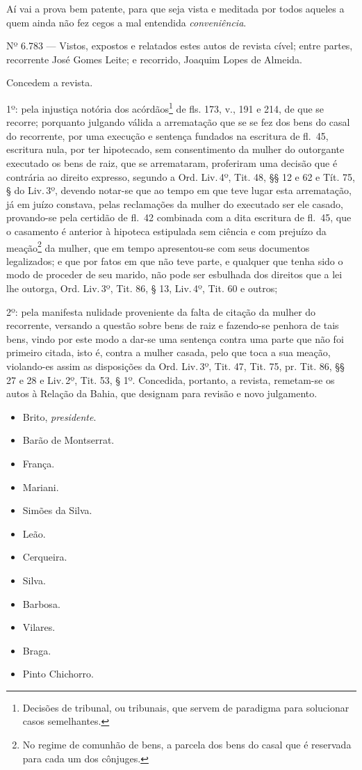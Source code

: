 Aí vai a prova bem patente, para que seja vista e meditada por todos
aqueles a quem ainda não fez cegos a mal entendida \emph{conveniência}.

Nº 6.783 --- Vistos, expostos e relatados estes autos de revista cível;
entre partes, recorrente José Gomes Leite; e recorrido, Joaquim Lopes de
Almeida.

Concedem a revista.

1º: pela injustiça notória dos acórdãos\footnote{Decisões de tribunal,
  ou tribunais, que servem de paradigma para solucionar casos
  semelhantes.} de fls. 173, v., 191 e 214, de que se recorre;
porquanto julgando válida a arrematação que se se fez dos bens do casal
do recorrente, por uma execução e sentença fundados na escritura
de fl.~45, escritura nula, por ter hipotecado, sem consentimento
da mulher do outorgante executado os bens de raiz, que se arremataram,
proferiram uma decisão que é contrária ao direito expresso, segundo a
Ord. Liv.\,4º, Tit. 48, §§ 12 e 62 e Tít. 75, § do Liv.\,3º, devendo
notar-se que ao tempo em que teve lugar esta arrematação, já em juízo
constava, pelas reclamações da mulher do executado ser ele casado,
provando-se pela certidão de fl.~42 combinada com a dita escritura
de fl.~45, que o casamento é anterior à hipoteca estipulada sem
ciência e com prejuízo da meação\footnote{No regime de comunhão de
  bens, a parcela dos bens do casal que é reservada para cada um dos
  cônjuges.} da mulher, que em tempo apresentou-se com seus documentos
legalizados; e que por fatos em que não teve parte, e qualquer que tenha
sido o modo de proceder de seu marido, não pode ser esbulhada dos
direitos que a lei lhe outorga, Ord. Liv.\,3º, Tit. 86, § 13, Liv.\,4º,
Tit. 60 e outros;

2º: pela manifesta nulidade proveniente da falta de citação da mulher do
recorrente, versando a questão sobre bens de raiz e fazendo-se penhora
de tais bens, vindo por este modo a dar-se uma sentença contra uma parte
que não foi primeiro citada, isto é, contra a mulher casada, pelo que
toca a sua meação, violando-es assim as disposições da Ord. Liv.\,3º,
Tit. 47, Tit. 75, pr. Tit. 86, §§ 27 e 28 e Liv.\,2º, Tit. 53, § 1º.
Concedida, portanto, a revista, remetam-se os autos à Relação da Bahia,
que designam para revisão e novo julgamento.


\begin{itemize}
\tightlist
\item
  Brito, \emph{presidente}.
\item
  Barão de Montserrat.
\item
  França.
\item
  Mariani.
\item
  Simões da Silva.
\item
  Leão.
\item
  Cerqueira.
\item
  Silva.
\item
  Barbosa.
\item
  Vilares.
\item
  Braga.
\item
  Pinto Chichorro.
\end{itemize}

